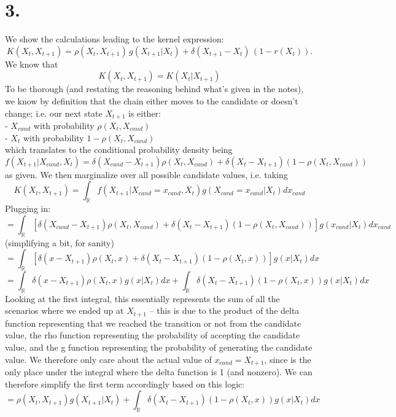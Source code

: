 \documentclass{article}
\begin{document}
{\Large 

\section*{3.}

We show the calculations leading to the kernel expression:
\[
  K(X_t,X_{t+1}) = \rho(X_t,X_{t+1})\,g(X_{t+1}|X_t)  + \delta(X_{t+1}-X_t)\,(1 - r(X_t)).
\]
We know that 
\[
  K(X_t,X_{t+1}) = K(X_t|X_{t+1}) 
\]
To be thorough (and restating the reasoning behind what's given in the notes), we know by definition that the chain either moves to the candidate or doesn't change; i.e. our next state \(X_{t+1}\) is either: \\
- \(X_{cand}\) with probability \(\rho(X_t, X_{cand})\) \\
- \(X_t\) with probability \(1 - \rho(X_t, X_{cand})\) \\
which translates to the conditional probability density being 
\[
  f(X_{t+1} | X_{cand}, X_t ) = \delta (X_{cand} - X_{t+1}) \rho(X_t, X_{cand}) + \delta(X_t - X_{t+1}) (1 - \rho(X_t, X_{cand}))
\]
as given. We then marginalize over all possible candidate values, i.e. taking
\[
  K(X_t, X_{t+1}) = \int_{\mathbb{R}} f(X_{t+1} | X_{cand} = x_{cand}, X_t) g(X_{cand} = x_{cand}| X_t)dx_{cand}
\]
Plugging in:
\[
  = \int_{\mathbb{R}} [\delta(X_{cand} - X_{t+1}) \rho (X_t, X_{cand}) + \delta(X_t - X_{t+1}) (1 - \rho(X_t, X_{cand})) ] g(x_{cand} | X_t) dx_{cand}
\]
(simplifying a bit, for sanity)
\[
  = \int_{\mathbb{R}} [\delta(x - X_{t+1}) \rho (X_t, x) + \delta(X_t - X_{t+1}) (1 - \rho(X_t, x)) ] g(x | X_t) dx
\]
\[
  = \int_{\mathbb{R}} \delta(x - X_{t+1}) \rho (X_t, x) g(x | X_t) dx + \int_{\mathbb{R}} \delta(X_t - X_{t+1}) (1 - \rho(X_t, x)) g(x | X_t) dx
\]
Looking at the first integral, this essentially represents the sum of all the scenarios where we ended up at \(X_{t+1}\) -- this is due to the product of the delta function representing that we reached the transition or not from the candidate value, the rho function representing the probability of accepting the candidate value, and the g function representing the probability of generating the candidate value. We therefore only care about the actual value of \(x_{cand} = X_{t+1}\), since is the only place under the integral where the delta function is 1 (and nonzero). We can therefore simplify the first term accordingly based on this logic:
\[
  = \rho (X_t, X_{t+1}) g(X_{t+1} | X_t) + \int_{\mathbb{R}} \delta(X_t - X_{t+1}) (1 - \rho(X_t, x)) g(x | X_t) dx
\]}
\end{document}
